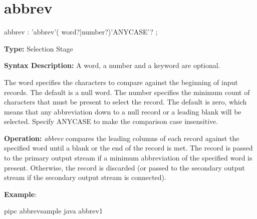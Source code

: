 \section{abbrev}
\begin{shaded}
\begin{rail}
  abbrev : 'abbrev'( word?|number?)'ANYCASE'?
  ;
\end{rail}
\end{shaded}

\textbf{Type:} Selection Stage

\textbf{Syntax Description:} A word, a number and a keyword are
optional.

The word specifies the characters to compare against the beginning of
input records. The default is a null word. The number specifies the
minimum count of characters that must be present to select the
record. The default is zero, which means that any abbreviation down to
a null record or a leading blank will be selected. Specify ANYCASE to
make the comparison case insensitive. 

\textbf{Operation:}  \emph{abbrev} compares the leading columns of
each record against the specified word until a blank or the end of the
record is met. The record is passed to the primary output stream if a
minimum abbreviation of the specified word is present. Otherwise, the
record is discarded (or passed to the secondary output stream if the
secondary output stream is connected).

\textbf{Example}:
 
\bash[stdout]
pipc abbrevsample
\END
\bash[stdout]
java abbrev1
\END
